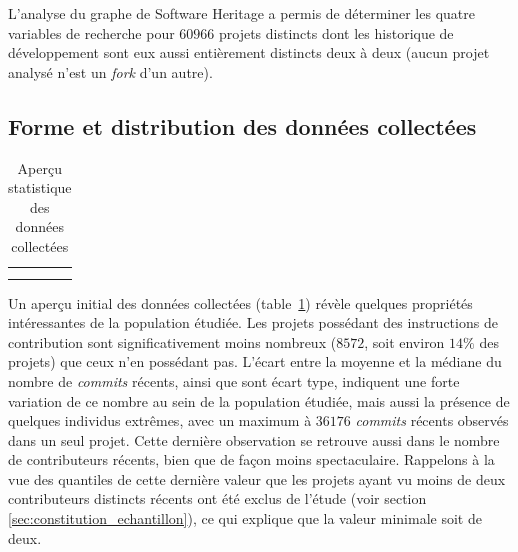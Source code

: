 \documentclass[dvipsnames,runningheads]{llncs}
\newcommand{\en}[1]{\foreignlanguage{english}{\emph{#1}}}
\begin{document}
    L'analyse du graphe de Software Heritage a permis de déterminer les quatre variables de recherche pour
    $60 966$ projets distincts dont les historique de développement sont eux aussi entièrement distincts deux
    à deux (aucun projet analysé n'est un \en{fork} d'un autre).

    \subsection{Forme et distribution des données collectées}

    \begin{table}[ht]
        \centering
        \caption{Aperçu statistique des données collectées}
        \begin{tabular}{c|c}
             &
            \\
            \hline
            \\
             &
            
        \end{tabular}
        \label{tab:data_description}
    \end{table}

    Un aperçu initial des données collectées (table~\ref{tab:data_description}) révèle quelques propriétés
    intéressantes de la population étudiée. Les projets possédant des instructions de contribution sont
    significativement moins nombreux ($8 572$, soit environ $14\%$ des projets) que ceux n'en possédant pas.
    L'écart entre la moyenne et la médiane du nombre de \en{commits} récents, ainsi que sont écart type,
    indiquent une forte variation de ce nombre au sein de la population étudiée, mais aussi la présence de
    quelques individus extrêmes, avec un maximum à $36 176$ \en{commits} récents observés dans un seul projet.
    Cette dernière observation se retrouve aussi dans le nombre de contributeurs récents, bien que de façon
    moins spectaculaire. Rappelons à la vue des quantiles de cette dernière valeur que les projets ayant vu
    moins de deux contributeurs distincts récents ont été exclus de l'étude (voir section
    \ref{sec:constitution_echantillon}), ce qui explique que la valeur minimale soit de deux.
\end{document}
